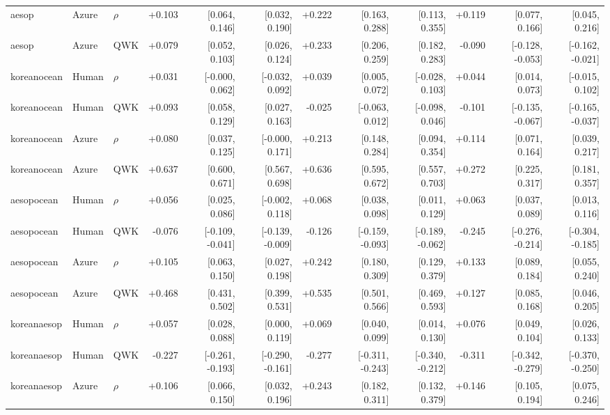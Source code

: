 \begin{landscape}
\begin{longtable}{@{}lllrrrrrrrrr@{}}
aesop & Azure & $\rho$ & +0.103 & [0.064, 0.146] & [0.032, 0.190] & +0.222 & [0.163, 0.288] & [0.113, 0.355] & +0.119 & [0.077, 0.166] & [0.045, 0.216]\\
aesop & Azure & QWK & +0.079 & [0.052, 0.103] & [0.026, 0.124] & +0.233 & [0.206, 0.259] & [0.182, 0.283] & -0.090 & [-0.128, -0.053] & [-0.162, -0.021]\\
\addlinespace[2pt]
koreanocean & Human & $\rho$ & +0.031 & [-0.000, 0.062] & [-0.032, 0.092] & +0.039 & [0.005, 0.072] & [-0.028, 0.103] & +0.044 & [0.014, 0.073] & [-0.015, 0.102]\\
koreanocean & Human & QWK & +0.093 & [0.058, 0.129] & [0.027, 0.163] & -0.025 & [-0.063, 0.012] & [-0.098, 0.046] & -0.101 & [-0.135, -0.067] & [-0.165, -0.037]\\
koreanocean & Azure & $\rho$ & +0.080 & [0.037, 0.125] & [-0.000, 0.171] & +0.213 & [0.148, 0.284] & [0.094, 0.354] & +0.114 & [0.071, 0.164] & [0.039, 0.217]\\
koreanocean & Azure & QWK & +0.637 & [0.600, 0.671] & [0.567, 0.698] & +0.636 & [0.595, 0.672] & [0.557, 0.703] & +0.272 & [0.225, 0.317] & [0.181, 0.357]\\
\addlinespace[2pt]
aesopocean & Human & $\rho$ & +0.056 & [0.025, 0.086] & [-0.002, 0.118] & +0.068 & [0.038, 0.098] & [0.011, 0.129] & +0.063 & [0.037, 0.089] & [0.013, 0.116]\\
aesopocean & Human & QWK & -0.076 & [-0.109, -0.041] & [-0.139, -0.009] & -0.126 & [-0.159, -0.093] & [-0.189, -0.062] & -0.245 & [-0.276, -0.214] & [-0.304, -0.185]\\
aesopocean & Azure & $\rho$ & +0.105 & [0.063, 0.150] & [0.027, 0.198] & +0.242 & [0.180, 0.309] & [0.129, 0.379] & +0.133 & [0.089, 0.184] & [0.055, 0.240]\\
aesopocean & Azure & QWK & +0.468 & [0.431, 0.502] & [0.399, 0.531] & +0.535 & [0.501, 0.566] & [0.469, 0.593] & +0.127 & [0.085, 0.168] & [0.046, 0.205]\\
\addlinespace[2pt]
koreanaesop & Human & $\rho$ & +0.057 & [0.028, 0.088] & [0.000, 0.119] & +0.069 & [0.040, 0.099] & [0.014, 0.130] & +0.076 & [0.049, 0.104] & [0.026, 0.133]\\
koreanaesop & Human & QWK & -0.227 & [-0.261, -0.193] & [-0.290, -0.161] & -0.277 & [-0.311, -0.243] & [-0.340, -0.212] & -0.311 & [-0.342, -0.279] & [-0.370, -0.250]\\
koreanaesop & Azure & $\rho$ & +0.106 & [0.066, 0.150] & [0.032, 0.196] & +0.243 & [0.182, 0.311] & [0.132, 0.379] & +0.146 & [0.105, 0.194] & [0.075, 0.246]\\

\end{longtable}
\end{landscape}
